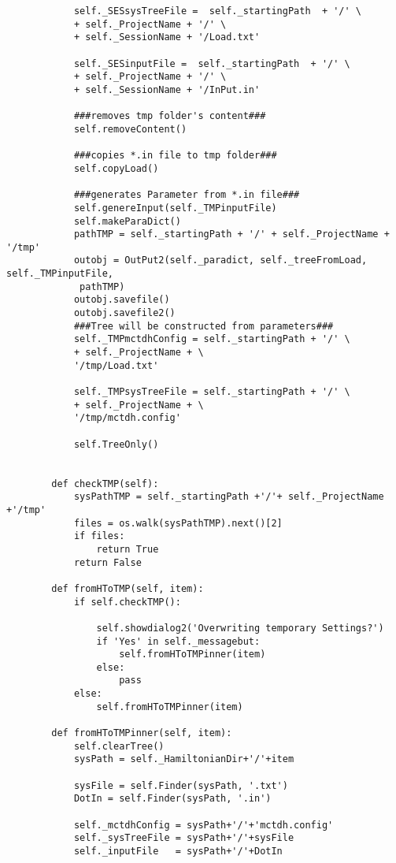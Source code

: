 \begin{verbatim}
            self._SESsysTreeFile =  self._startingPath  + '/' \
            + self._ProjectName + '/' \
            + self._SessionName + '/Load.txt'
    
            self._SESinputFile =  self._startingPath  + '/' \
            + self._ProjectName + '/' \
            + self._SessionName + '/InPut.in'
    
            ###removes tmp folder's content###
            self.removeContent()
    
            ###copies *.in file to tmp folder###
            self.copyLoad()
    
            ###generates Parameter from *.in file###
            self.genereInput(self._TMPinputFile)
            self.makeParaDict()
            pathTMP = self._startingPath + '/' + self._ProjectName + '/tmp'
            outobj = OutPut2(self._paradict, self._treeFromLoad, self._TMPinputFile,
             pathTMP)
            outobj.savefile()
            outobj.savefile2()
            ###Tree will be constructed from parameters###
            self._TMPmctdhConfig = self._startingPath + '/' \
            + self._ProjectName + \
            '/tmp/Load.txt'
    
            self._TMPsysTreeFile = self._startingPath + '/' \
            + self._ProjectName + \
            '/tmp/mctdh.config'
    
            self.TreeOnly()
                
    
        def checkTMP(self):
            sysPathTMP = self._startingPath +'/'+ self._ProjectName +'/tmp'
            files = os.walk(sysPathTMP).next()[2]
            if files:
                return True
            return False
    
        def fromHToTMP(self, item):
            if self.checkTMP():
    
                self.showdialog2('Overwriting temporary Settings?')
                if 'Yes' in self._messagebut:
                    self.fromHToTMPinner(item)
                else:
                    pass
            else:
                self.fromHToTMPinner(item)
    
        def fromHToTMPinner(self, item):
            self.clearTree()
            sysPath = self._HamiltonianDir+'/'+item
    
            sysFile = self.Finder(sysPath, '.txt')
            DotIn = self.Finder(sysPath, '.in')
    
            self._mctdhConfig = sysPath+'/'+'mctdh.config'
            self._sysTreeFile = sysPath+'/'+sysFile
            self._inputFile   = sysPath+'/'+DotIn
    

\end{verbatim}
